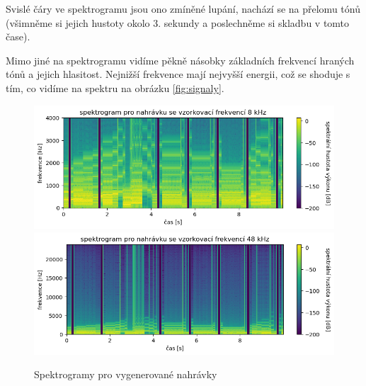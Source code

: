 \documentclass[a4paper, 12pt]{article}
\begin{document}
	Svislé čáry ve spektrogramu jsou ono zmíněné lupání, nachází se na přelomu tónů (všimněme si jejich hustoty okolo 3. sekundy a poslechněme si skladbu v tomto čase).
	
	Mimo jiné na spektrogramu vidíme pěkně násobky základních frekvencí hraných tónů a jejich hlasitost. Nejnižší frekvence mají nejvyšší energii, což se shoduje s tím, co vidíme na spektru na obrázku \ref{fig:signaly}.
	
	\begin{figure}[H]
		\includegraphics[width=\textwidth]{src/spectr_8k.png}
		\includegraphics[width=\textwidth]{src/spectr_48k.png}
		\caption{Spektrogramy pro vygenerované nahrávky}
	\end{figure}
	
	\newpage
	\renewcommand{\refname}{Zdroje}
	\printbibliography
\end{document}
